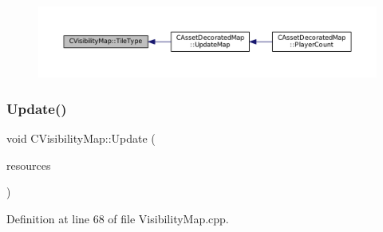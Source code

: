 \nopagebreak
\begin{figure}[H]
\begin{center}
\leavevmode
\includegraphics[width=350pt]{classCVisibilityMap_a8517fe52114dd469093fd1bd13482733_icgraph}
\end{center}
\end{figure}
\hypertarget{classCVisibilityMap_a5ca9902ef0bc2714617719800e20aa19}{}\label{classCVisibilityMap_a5ca9902ef0bc2714617719800e20aa19} 
\subsubsection{\texorpdfstring{Update()}{Update()}}
{\footnotesize\ttfamily void C\+Visibility\+Map\+::\+Update (\begin{DoxyParamCaption}\item[{const std\+::list$<$ std\+::weak\+\_\+ptr$<$ \hyperlink{classCPlayerAsset}{C\+Player\+Asset} $>$ $>$ \&}]{resources }\end{DoxyParamCaption})}



Definition at line 68 of file Visibility\+Map.\+cpp.


